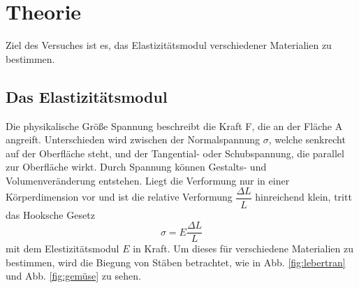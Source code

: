 \section{Theorie}
\label{sec:Theorie}

Ziel des Versuches ist es, das Elastizitätsmodul verschiedener Materialien zu bestimmen.

\subsection{Das Elastizitätsmodul}
    Die physikalische Größe Spannung beschreibt die Kraft F, die an der Fläche A
    angreift. Unterschieden wird zwischen der Normalspannung $\sigma$, welche 
    senkrecht auf der Oberfläche steht, und der Tangential- oder Schubspannung, die parallel 
    zur Oberfläche wirkt. Durch Spannung können Gestalts- und Volumenveränderung entstehen.
    Liegt die Verformung nur in einer Körperdimension vor und ist die relative 
    Verformung $\dfrac{\Delta L}{L}$ hinreichend klein, tritt das Hooksche Gesetz
    \begin{equation}
        \label{eqn:Hook}
        \sigma = E \dfrac{\Delta L}{L}
    \end{equation}
    mit dem Elestizitätsmodul $E$ in Kraft. Um dieses für verschiedene Materialien zu bestimmen, 
    wird die Biegung von Stäben betrachtet, wie in Abb. \ref{fig:lebertran} und Abb. 
    \ref{fig:gemüse} zu sehen.

